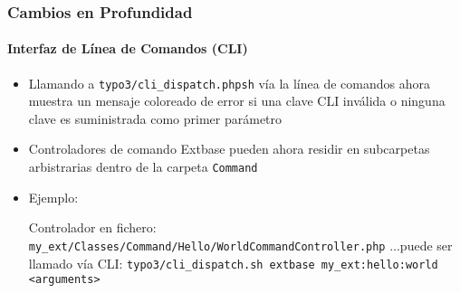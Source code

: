 \begin{frame}[fragile]
	\frametitle{Cambios en Profundidad}
	\framesubtitle{Interfaz de Línea de Comandos (CLI)}

	\lstset{basicstyle=\tiny\ttfamily}

	\begin{itemize}

		\item Llamando a \texttt{typo3/cli\_dispatch.phpsh} vía la línea de comandos ahora muestra un
			mensaje coloreado de error si una clave CLI inválida o ninguna clave es suministrada como primer parámetro

		\item Controladores de comando Extbase pueden ahora residir en subcarpetas arbistrarias dentro de la
			carpeta \texttt{Command}

		\item Ejemplo:\newline

			Controlador en fichero:\newline
			\smaller\texttt{my\_ext/Classes/Command/Hello/WorldCommandController.php}\normalsize\newline
			...puede ser llamado vía CLI:\newline
			\smaller\texttt{typo3/cli\_dispatch.sh extbase my\_ext:hello:world <arguments>}\normalsize

	\end{itemize}

\end{frame}


